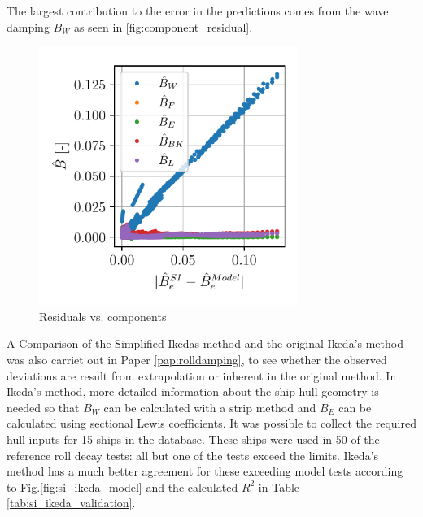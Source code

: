 \noindent The largest contribution to the error in the predictions comes from the wave damping $B_W$ as seen in \autoref{fig:component_residual}.
\begin{figure}[H]
    \includegraphics[width=0.75\textwidth]{kappa/images/component_residual.pdf}
    \caption{Residuals vs. components}
    \label{fig:component_residual}
\end{figure}
A Comparison of the Simplified-Ikedas method and the original Ikeda's method was also carriet out in Paper \ref{pap:rolldamping}, to see whether the observed deviations are result from extrapolation or inherent in the original method. In Ikeda's method, more detailed information about the ship hull geometry is needed so that $B_W$ can be calculated with a strip method and $B_E$ can be calculated using sectional Lewis coefficients. It was possible to collect the required hull inputs for 15 ships in the database. These ships were used in 50 of the reference roll decay tests: all but one of the tests exceed the limits. Ikeda's method has a much better agreement for these exceeding model tests according to Fig.\ref{fig:si_ikeda_model} and the calculated $R^2$ in Table \ref{tab:si_ikeda_validation}.

